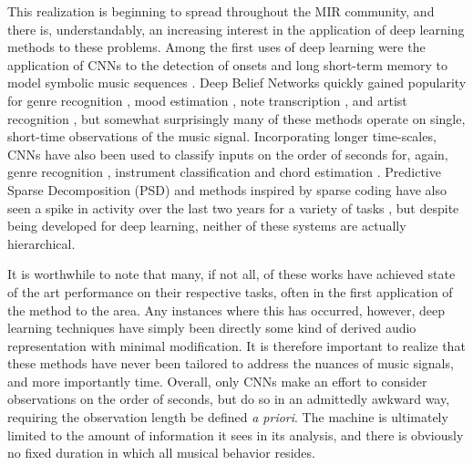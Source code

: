This realization is beginning to spread throughout the MIR community, and there is, understandably, an increasing interest in the application of deep learning methods to these problems.
Among the first uses of deep learning were the application of CNNs to the detection of onsets \cite{Lacoste2007} and long short-term memory to model symbolic music sequences \cite{Eck2008}.
Deep Belief Networks quickly gained popularity for genre recognition \cite{Hamel2009}, mood estimation \cite{Schmidt2011}, note transcription \cite{Nam2011}, and artist recognition \cite{Dieleman2011}, but somewhat surprisingly many of these methods operate on single, short-time observations of the music signal.
Incorporating longer time-scales, CNNs have also been used to classify inputs on the order of seconds for, again, genre recognition \cite{Li2010}, instrument classification \cite{Humphrey2010} and chord estimation \cite{Humphrey2011, Humphrey2012b}.
Predictive Sparse Decomposition (PSD) and methods inspired by sparse coding have also seen a spike in activity over the last two years for a variety of tasks \cite{Henaff2011, Nam2012}, but despite being developed for deep learning, neither of these systems are actually hierarchical.


It is worthwhile to note that many, if not all, of these works have achieved state of the art performance on their respective tasks, often in the first application of the method to the area.
Any instances where this has occurred, however, deep learning techniques have simply been directly some kind of derived audio representation with minimal modification.
It is therefore important to realize that these methods have never been tailored to address the nuances of music signals, and more importantly time.
Overall, only CNNs make an effort to consider observations on the order of seconds, but do so in an admittedly awkward way, requiring the observation length be defined \emph{a priori}.
The machine is ultimately limited to the amount of information it sees in its analysis, and there is obviously no fixed duration in which all musical behavior resides.


